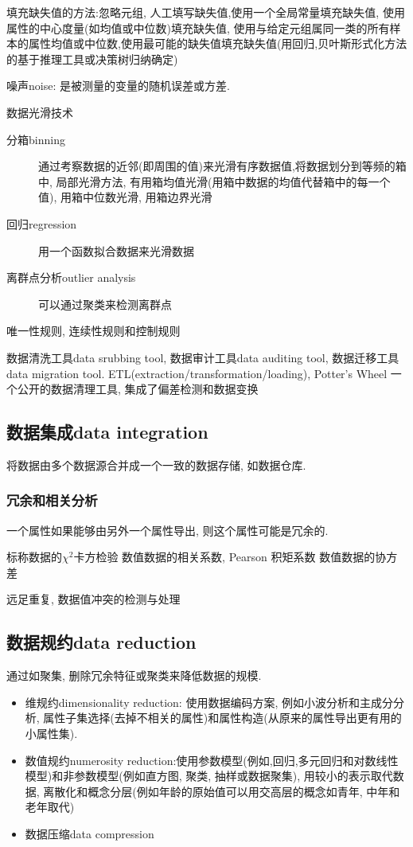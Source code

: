 \documentclass{article}
\begin{document}
填充缺失值的方法:忽略元组, 人工填写缺失值,使用一个全局常量填充缺失值, 使用属性的中心度量(如均值或中位数)填充缺失值, 使用与给定元组属同一类的所有样本的属性均值或中位数,使用最可能的缺失值填充缺失值(用回归,贝叶斯形式化方法的基于推理工具或决策树归纳确定)

噪声noise: 是被测量的变量的随机误差或方差.

数据光滑技术
\begin{description}
	\item [分箱binning] 通过考察数据的近邻(即周围的值)来光滑有序数据值,将数据划分到等频的箱中, 局部光滑方法, 有用箱均值光滑(用箱中数据的均值代替箱中的每一个值), 用箱中位数光滑, 用箱边界光滑
	\item [回归regression] 用一个函数拟合数据来光滑数据
	\item [离群点分析outlier analysis] 可以通过聚类来检测离群点
\end{description}

唯一性规则, 连续性规则和控制规则

数据清洗工具data srubbing tool, 数据审计工具data auditing tool, 数据迁移工具data migration tool. ETL(extraction/transformation/loading), Potter's Wheel 一个公开的数据清理工具, 集成了偏差检测和数据变换

\subsection{数据集成data integration}
将数据由多个数据源合并成一个一致的数据存储, 如数据仓库.
\subsubsection{冗余和相关分析}
一个属性如果能够由另外一个属性导出, 则这个属性可能是冗余的.

标称数据的$\chi^2$卡方检验
数值数据的相关系数, Pearson 积矩系数
数值数据的协方差

远足重复, 数据值冲突的检测与处理

\subsection{数据规约data reduction}
通过如聚集, 删除冗余特征或聚类来降低数据的规模.
\begin{itemize}
	\item 维规约dimensionality reduction: 使用数据编码方案, 例如小波分析和主成分分析, 属性子集选择(去掉不相关的属性)和属性构造(从原来的属性导出更有用的小属性集).
	\item 数值规约numerosity reduction:使用参数模型(例如,回归,多元回归和对数线性模型)和非参数模型(例如直方图, 聚类, 抽样或数据聚集), 用较小的表示取代数据, 离散化和概念分层(例如年龄的原始值可以用交高层的概念如青年, 中年和老年取代)
	\item 数据压缩data compression
\end{itemize}
\end{document}
